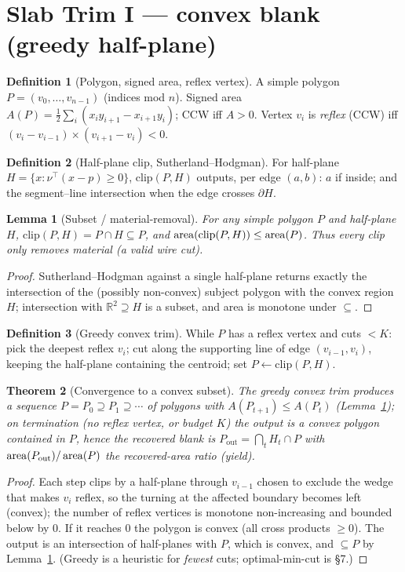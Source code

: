 \documentclass[11pt]{article}
\theoremstyle{definition}\newtheorem{definition}{Definition}[section]
\theoremstyle{plain}\newtheorem{theorem}{Theorem}[section]
\newtheorem{lemma}[theorem]{Lemma}\newtheorem{proposition}[theorem]{Proposition}
\newcommand{\R}{\mathbb{R}}\newcommand{\Z}{\mathbb{Z}}\newcommand{\Norm}[1]{\lVert #1\rVert}
\begin{document}
\section{Slab Trim I --- convex blank (greedy half-plane)}
\begin{definition}[Polygon, signed area, reflex vertex]
A simple polygon $P=(v_0,\dots,v_{n-1})$ (indices mod $n$). Signed area
$A(P)=\tfrac12\sum_i (x_i y_{i+1}-x_{i+1}y_i)$; CCW iff $A>0$. Vertex $v_i$ is \emph{reflex} (CCW) iff
$(v_i-v_{i-1})\times(v_{i+1}-v_i)<0$.
\end{definition}
\begin{definition}[Half-plane clip, Sutherland--Hodgman]
For half-plane $H=\{x:\nu^\top(x-p)\ge0\}$, $\mathrm{clip}(P,H)$ outputs, per edge $(a,b)$: $a$ if inside;
and the segment--line intersection when the edge crosses $\partial H$.
\end{definition}
\begin{lemma}[Subset / material-removal]\label{lem:sh}
For any simple polygon $P$ and half-plane $H$, $\mathrm{clip}(P,H)=P\cap H\subseteq P$, and
$\operatorname{area}(\mathrm{clip}(P,H))\le\operatorname{area}(P)$. Thus every clip only removes material (a valid wire cut).
\end{lemma}
\begin{proof}
Sutherland--Hodgman against a single half-plane returns exactly the intersection of the (possibly
non-convex) subject polygon with the convex region $H$; intersection with $\R^2\supseteq H$ is a subset, and
area is monotone under $\subseteq$.
\end{proof}
\begin{definition}[Greedy convex trim]
While $P$ has a reflex vertex and cuts $<K$: pick the deepest reflex $v_i$; cut along the supporting line of
edge $(v_{i-1},v_i)$, keeping the half-plane containing the centroid; set $P\leftarrow\mathrm{clip}(P,H)$.
\end{definition}
\begin{theorem}[Convergence to a convex subset]\label{thm:trim}
The greedy convex trim produces a sequence $P=P_0\supseteq P_1\supseteq\cdots$ of polygons with
$A(P_{t+1})\le A(P_t)$ (Lemma~\ref{lem:sh}); on termination (no reflex vertex, or budget $K$) the output is a
convex polygon contained in $P$, hence the recovered blank is $P_{\mathrm{out}}=\bigcap_t H_t\cap P$ with
$\operatorname{area}(P_{\mathrm{out}})/\operatorname{area}(P)$ the recovered-area ratio (yield).
\end{theorem}
\begin{proof}
Each step clips by a half-plane through $v_{i-1}$ chosen to exclude the wedge that makes $v_i$ reflex, so the
turning at the affected boundary becomes left (convex); the number of reflex vertices is monotone
non-increasing and bounded below by $0$. If it reaches $0$ the polygon is convex (all cross products
$\ge0$). The output is an intersection of half-planes with $P$, which is convex, and $\subseteq P$ by
Lemma~\ref{lem:sh}. (Greedy is a heuristic for \emph{fewest} cuts; optimal-min-cut is \S7.)
\end{proof}
\end{document}
